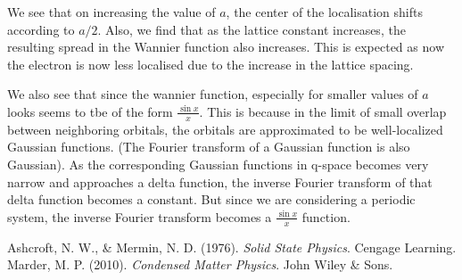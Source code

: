 \documentclass[12pt,a4paper]{article}
\begin{document}
We see that on increasing the value of $a$, the center of the localisation shifts according to $a/2$. Also, we find that as the lattice constant increases, the resulting spread in the Wannier function also increases. This is expected as now the electron is now less localised due to the increase in the lattice spacing.

We also see that since the wannier function, especially for smaller values of $a$ looks seems to tbe of the form $\frac{\sin x}{x}$. This is because in the limit of small overlap between neighboring orbitals, the orbitals are approximated to be well-localized Gaussian functions. (The Fourier transform of a Gaussian function is also Gaussian). As the corresponding Gaussian functions in q-space becomes very narrow and approaches a delta function, the inverse Fourier transform of that delta function becomes a constant. But since we are considering a periodic system, the inverse Fourier transform becomes a $\frac{\sin x}{x}$ function.
 
\begin{thebibliography}{9}
    Ashcroft, N. W., \& Mermin, N. D. (1976). \emph{Solid State Physics}. Cengage Learning.
    Marder, M. P. (2010). \emph{Condensed Matter Physics}. John Wiley \& Sons.
\end{thebibliography}
\end{document}
